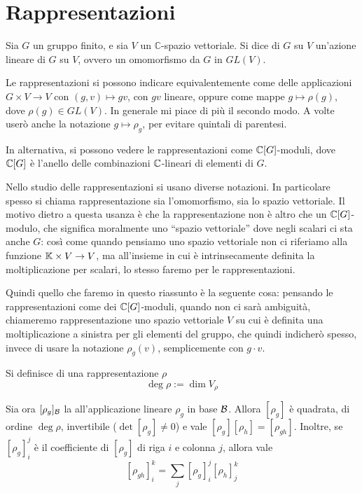 \section{Rappresentazioni}
	\begin{mydef}
		Sia $G$ un gruppo finito, e sia $V$ un $\mathbb C$-spazio vettoriale. Si dice  di $G$ su $V$ un'azione lineare di $G$ su $V$, ovvero un omomorfismo da $G$ in $GL(V)$.
	\end{mydef}

	Le rappresentazioni si possono indicare equivalentemente come delle applicazioni $G \times V \rightarrow V$ con $(g,v)\mapsto gv$, con $gv$ lineare, oppure come mappe $g \mapsto \rho(g)$, dove $\rho(g) \in GL(V)$. In generale mi piace di più il secondo modo. A volte userò anche la notazione $g \mapsto \rho_g$, per evitare quintali di parentesi.

	In alternativa, si possono vedere le rappresentazioni come $\mathbb C[G]$-moduli, dove $\mathbb C[G]$ è l'anello delle combinazioni $\mathbb C$-lineari di elementi di $G$.

	\begin{myobs}
		Nello studio delle rappresentazioni si usano diverse notazioni. In particolare spesso si chiama rappresentazione sia l'omomorfismo, sia lo spazio vettoriale. Il motivo dietro a questa usanza è che la rappresentazione non è altro che un $\mathbb C[G]$-modulo, che significa moralmente uno ``spazio vettoriale'' dove negli scalari ci sta anche $G$: così come quando pensiamo uno spazio vettoriale non ci riferiamo alla funzione $\mathbb K \times V \rightarrow V$, ma all'insieme in cui è intrinsecamente definita la moltiplicazione per scalari, lo stesso faremo per le rappresentazioni.
		
		Quindi quello che faremo in questo riassunto è la seguente cosa: pensando le rappresentazioni come dei $\mathbb C[G]$-moduli, quando non ci sarà ambiguità, chiameremo rappresentazione uno spazio vettoriale $V$ su cui è definita una moltiplicazione a sinistra per gli elementi del gruppo, che quindi indicherò spesso, invece di usare la notazione $\rho_g(v)$, semplicemente con $g\cdot v$. 
	\end{myobs}

	\begin{mydef}
		Si definisce  di una rappresentazione $\rho$
		\[\deg \rho := \dim V_\rho\]
	\end{mydef}


	Sia ora $[\rho_g]_\mathcal B$ la  all'applicazione lineare $\rho_g$ in base $\mathcal B$. Allora $[\rho_g]$ è quadrata, di ordine $\deg \rho$, invertibile ($\det [\rho_g]\ne 0$) e vale $[\rho_g] [\rho_h]=[\rho_{gh}]$. Inoltre, se $[\rho_g]_i^j$ è il coefficiente di $[\rho_g]$ di riga $i$ e colonna $j$, allora vale
	\[
		[\rho_{gh}]_i^k=\sum_j [\rho_g]_i^j [\rho_h]_j^k
	\]

